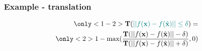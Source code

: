 \documentclass[aspectratio=169]{beamer}
\newcommand{\coloured}[1]{\textcolor{MyColour}{#1}}
\begin{document}
\begin{frame}
\frametitle{Example - translation}
\begin{align*}
\only<1-2>{\large{\translation (\coloured{ || f(\x) - f(\hat{\x})|| \leq \delta}) }=}\\
\only<2>{1 - \max(\dfrac{\translation(|| f(\x) - f(\hat{\x})|| - \delta)}{\translation (|| f(\x) - f(\hat{\x})|| + \delta)},0) }
\end{align*}
\end{frame}
\end{document}
